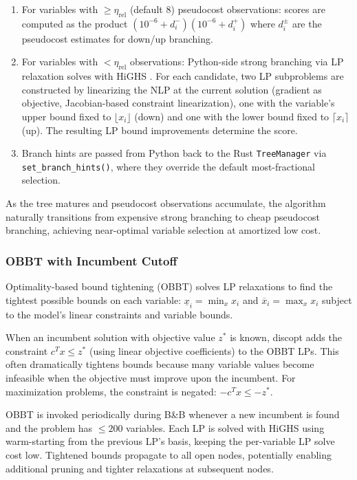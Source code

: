 \documentclass[12pt,preprint]{article}
\begin{document}
\begin{enumerate}
\item For variables with $\ge \eta_{\text{rel}}$ (default 8) pseudocost observations: scores are computed as the product $(10^{-6} + d_i^-)(10^{-6} + d_i^+)$ where $d_i^{\pm}$ are the pseudocost estimates for down/up branching.
\item For variables with $< \eta_{\text{rel}}$ observations: Python-side strong branching via LP relaxation solves with HiGHS \cite{Huangfu2018}. For each candidate, two LP subproblems are constructed by linearizing the NLP at the current solution (gradient as objective, Jacobian-based constraint linearization), one with the variable's upper bound fixed to $\lfloor x_i \rfloor$ (down) and one with the lower bound fixed to $\lceil x_i \rceil$ (up). The resulting LP bound improvements determine the score.
\item Branch hints are passed from Python back to the Rust \texttt{TreeManager} via \texttt{set\_branch\_hints()}, where they override the default most-fractional selection.
\end{enumerate}

As the tree matures and pseudocost observations accumulate, the algorithm naturally transitions from expensive strong branching to cheap pseudocost branching, achieving near-optimal variable selection at amortized low cost.

\subsubsection{OBBT with Incumbent Cutoff}
\label{org-obbt-incumbent-cutoff}
Optimality-based bound tightening (OBBT) \cite{Gleixner2017} solves LP relaxations to find the tightest possible bounds on each variable: $\underline{x}_i = \min_{x} x_i$ and $\overline{x}_i = \max_{x} x_i$ subject to the model's linear constraints and variable bounds.

When an incumbent solution with objective value $z^*$ is known, discopt adds the constraint $c^T x \le z^*$ (using linear objective coefficients) to the OBBT LPs. This often dramatically tightens bounds because many variable values become infeasible when the objective must improve upon the incumbent. For maximization problems, the constraint is negated: $-c^T x \le -z^*$.

OBBT is invoked periodically during B\&B whenever a new incumbent is found and the problem has $\le 200$ variables. Each LP is solved with HiGHS using warm-starting from the previous LP's basis, keeping the per-variable LP solve cost low. Tightened bounds propagate to all open nodes, potentially enabling additional pruning and tighter relaxations at subsequent nodes.
\end{document}
